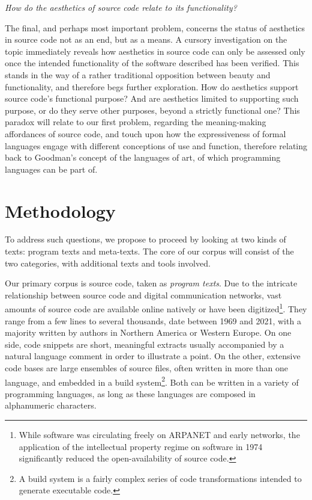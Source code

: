 \vspace*{1\baselineskip}

\emph{How do the aesthetics of source code relate to its functionality?}

The final, and perhaps most important problem, concerns the status of aesthetics in source code not as an end, but as a means. A cursory investigation on the topic immediately reveals how aesthetics in source code can only be assessed only once the intended functionality of the software described has been verified. This stands in the way of a rather traditional opposition between beauty and functionality, and therefore begs further exploration. How do aesthetics support source code's functional purpose? And are aesthetics limited to supporting such purpose, or do they serve other purposes, beyond a strictly functional one? This paradox will relate to our first problem, regarding the meaning-making affordances of source code, and touch upon how the expressiveness of formal languages engage with different conceptions of use and function, therefore relating back to Goodman's concept of the languages of art, of which programming languages can be part of.

\section{Methodology}

To address such questions, we propose to proceed by looking at two kinds of texts: program texts and meta-texts. The core of our corpus will consist of the two categories, with additional texts and tools involved.

Our primary corpus is source code, taken as \emph{program texts}. Due to the intricate relationship between source code and digital communication networks, vast amounts of source code are available online natively or have been digitized\footnote{While software was circulating freely on ARPANET and early networks, the application of the intellectual property regime on software in 1974 significantly reduced the open-availability of source code.}. They range from a few lines to several thousands, date between 1969 and 2021, with a majority written by authors in Northern America or Western Europe. On one side, code snippets are short, meaningful extracts usually accompanied by a natural language comment in order to illustrate a point. On the other, extensive code bases are large ensembles of source files, often written in more than one language, and embedded in a build system\footnote{A build system is a fairly complex series of code transformations intended to generate executable code.}. Both can be written in a variety of programming languages, as long as these languages are composed in alphanumeric characters.

